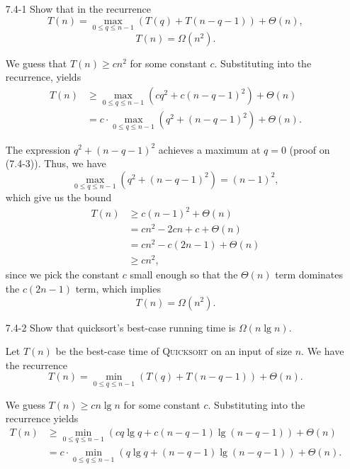 \begin{enumerate}

\item[7.4{-}1]{Show that in the recurrence
\[
  T(n) = \max_{0 \le q \le n - 1}(T(q) + T(n - q - 1)) + \Theta(n),
\]
\[
  T(n) = \Omega(n^2).
\]}

\begin{framed}
We guess that $T(n) \ge cn^2$ for some constant $c$. Substituting into the
recurrence, yields
\begin{equation*}
\begin{aligned}
  T(n) &\ge \max_{0 \le q \le n - 1}(cq^2 + c(n - q - 1)^2) + \Theta(n)\\
       &=   c \cdot \max_{0 \le q \le n - 1}(q^2 + (n - q - 1)^2) + \Theta(n).
\end{aligned}
\end{equation*}

The expression $q^2 + (n - q - 1)^2$ achieves a maximum at $q = 0$ (proof on
(7.4-3)). Thus, we have
\[
  \max_{0 \le q \le n - 1}(q^2 + (n - q - 1)^2) = (n - 1)^2,
\]
which give us the bound
\begin{equation*}
\begin{aligned}
  T(n) &\ge c (n - 1)^2 + \Theta(n)\\
       &=   cn^2 - 2cn + c + \Theta(n)\\
       &=   cn^2 - c(2n - 1) + \Theta(n)\\
       &\ge cn^2,
\end{aligned}
\end{equation*}
since we pick the constant $c$ small enough so that the $\Theta(n)$ term
dominates the $c(2n - 1)$ term, which implies
\[
  T(n) = \Omega(n^2).
\]
\end{framed}

\item[7.4{-}2]{Show that quicksort's best-case running time is $\Omega(n \lg n)$.}

\begin{framed}
Let $T(n)$ be the best-case time of \textsc{Quicksort} on an input of size
$n$. We have the recurrence
\[
  T(n) = \min_{0 \le q \le n - 1}(T(q) + T(n - q - 1)) + \Theta(n).
\]

We guess $T(n) \ge cn \lg n$ for some constant $c$. Substituting into the
recurrence yields
\begin{equation*}
\begin{aligned}
  T(n) &\ge \min_{0 \le q \le n - 1}(cq \lg q + c(n - q - 1) \lg (n - q - 1)) + \Theta(n)\\
       &=   c \cdot \min_{0 \le q \le n - 1}(q \lg q + (n - q - 1) \lg (n - q - 1)) + \Theta(n).
\end{aligned}
\end{equation*}


\end{framed}
\end{enumerate}
